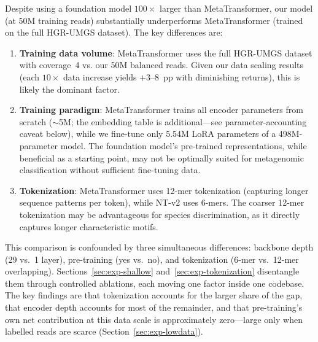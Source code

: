 Despite using a foundation model $100\times$ larger than MetaTransformer, our model (at 50M training reads) substantially underperforms MetaTransformer (trained on the full HGR-UMGS dataset). The key differences are:

\begin{enumerate}
    \item \textbf{Training data volume}: MetaTransformer uses the full HGR-UMGS dataset with coverage~4 vs. our 50M balanced reads. Given our data scaling results (each $10\times$ data increase yields $+3$--$8$~pp with diminishing returns), this is likely the dominant factor.
    
    \item \textbf{Training paradigm}: MetaTransformer trains all encoder parameters from scratch ($\sim$5M; the embedding table is additional---see parameter-accounting caveat below), while we fine-tune only 5.54M LoRA parameters of a 498M-parameter model. The foundation model's pre-trained representations, while beneficial as a starting point, may not be optimally suited for metagenomic classification without sufficient fine-tuning data.
    
    \item \textbf{Tokenization}: MetaTransformer uses 12-mer tokenization (capturing longer sequence patterns per token), while NT-v2 uses 6-mers. The coarser 12-mer tokenization may be advantageous for species discrimination, as it directly captures longer characteristic motifs.
\end{enumerate}

This comparison is confounded by three simultaneous differences: backbone depth (29 vs.\ 1 layer), pre-training (yes vs.\ no), and tokenization (6-mer vs.\ 12-mer overlapping). Sections~\ref{sec:exp-shallow} and~\ref{sec:exp-tokenization} disentangle them through controlled ablations, each moving one factor inside one codebase. The key findings are that tokenization accounts for the larger share of the gap, that encoder depth accounts for most of the remainder, and that pre-training's own net contribution at this data scale is approximately zero---large only when labelled reads are scarce (Section~\ref{sec:exp-lowdata}).


